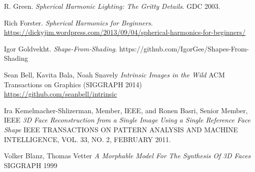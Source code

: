 \documentclass[10pt,twocolumn,letterpaper]{article}
\begin{document}
\begin{thebibliography}{1}
	R. Green.
	\textit{Spherical Harmonic Lighting: The Gritty Details}. 
	GDC 2003.
	
	Rich Forster.
	\textit{Spherical Harmonics for Beginners}. 
	\url{https://dickyjim.wordpress.com/2013/09/04/spherical-harmonics-for-beginners/}

	Igor Goldvekht. 
	\textit{Shape-From-Shading}. 
	https://github.com/IgorGee/Shapes-From-Shading
    
    Sean Bell, Kavita Bala, Noah Snavely
    \textit{Intrinsic Images in the Wild}
     ACM Transactions on Graphics (SIGGRAPH 2014)
     \url{https://github.com/seanbell/intrinsic}
    
    Ira Kemelmacher-Shlizerman, Member, IEEE, and Ronen Basri, Senior Member, IEEE \textit{3D Face Reconstruction from a Single Image Using a Single Reference Face Shape}
    IEEE TRANSACTIONS ON PATTERN ANALYSIS AND MACHINE INTELLIGENCE, VOL. 33, NO. 2, FEBRUARY 2011.
    
    Volker Blanz, Thomas Vetter
    \textit{A Morphable Model For The Synthesis Of 3D Faces}
    SIGGRAPH 1999
    
\end{thebibliography}
\end{document}
